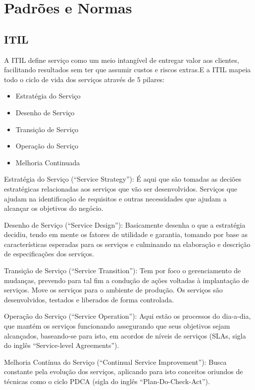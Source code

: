 \section{Padrões e Normas}
\subsection{ITIL}

A ITIL define serviço como um meio intangível de entregar valor aos clientes,
facilitando resultados sem ter que assumir custos e riscos extras.E a ITIL mapeia
todo o ciclo de vida dos serviços através de 5 pilares:
\begin{itemize}[noitemsep]
  \item Estratégia do Serviço
  \item Desenho de Serviço
  \item Transição de Serviço
  \item Operação do Serviço
  \item Melhoria Continuada
\end{itemize}

Estratégia do Serviço (“Service Strategy”): É aqui que são tomadas as deciões estratégicas relacionadas aos serviços que vão ser desenvolvidos. Serviços que ajudam na identificação de requisitos e outras necessidades que ajudam a alcançar os objetivos do negócio.

Desenho de Serviço (“Service Design”): Basicamente desenha o que a estratégia decidiu, tendo em mente os fatores de utilidade e garantia, tomando por base as características esperadas para os serviços e culminando na elaboração e descrição de especificações dos serviços.

Transição de Serviço (“Service Transition”): Tem por foco o gerenciamento de mudanças, prevendo para tal fim a condução de ações voltadas à implantação de serviços. Move os serviços para o ambiente de produção. Os serviços são desenvolvidos, testados e liberados de forma controlada.

Operação do Serviço (“Service Operation”): Aqui estão os processos do dia-a-dia, que mantém os serviços funcionando assegurando que seus objetivos sejam alcançados, baseando-se para isto, em acordos de níveis de serviços (SLAs, sigla do inglês “Service-level Agreements”).

Melhoria Contínua do Serviço (“Continual Service Improvement”): Busca constante pela evolução dos serviços, aplicando para isto conceitos oriundos de técnicas como o ciclo PDCA (sigla do inglês “Plan-Do-Check-Act”).

